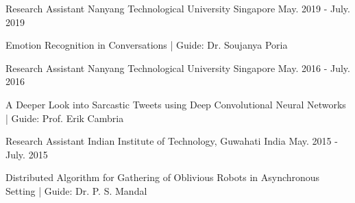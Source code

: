 

\begin{cventries}


  \cventry
    {Research Assistant} %
    {Nanyang Technological University} %
    {Singapore} %
    {May. 2019 - July. 2019} %
    {
      \begin{cvitems} %
        \item {Emotion Recognition in Conversations | Guide: Dr. Soujanya Poria}
      \end{cvitems}
    }
    
    
  \cventry
    {Research Assistant} %
    {Nanyang Technological University} %
    {Singapore} %
    {May. 2016 - July. 2016} %
    {
      \begin{cvitems} %
        \item {A Deeper Look into Sarcastic Tweets using Deep Convolutional Neural Networks | Guide: Prof. Erik Cambria}
      \end{cvitems}
    }

  \cventry
    {Research Assistant} %
    {Indian Institute of Technology, Guwahati} %
    {India} %
    {May. 2015 - July. 2015} %
    {
      \begin{cvitems} %
        \item {Distributed Algorithm for Gathering of Oblivious Robots in Asynchronous Setting | Guide: Dr. P. S. Mandal}
      \end{cvitems}
    }
\end{cventries}
